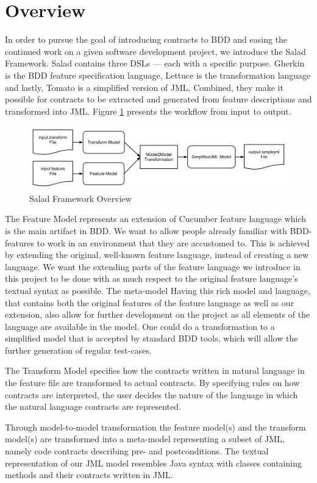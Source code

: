 \section{Overview}

In order to pursue the goal of introducing contracts to BDD and easing the continued work on a given software development project, we introduce the Salad Framework. Salad contains three DSLs --- each with a specific purpose. Gherkin is the BDD feature specification language, Lettuce is the transformation language and lastly, Tomato is a simplified version of JML.  Combined, they make it possible for contracts to be extracted and generated from feature descriptions and transformed into JML. Figure \ref{fig:saladoverview} presents the workflow from input to output.

\begin{figure}
	\begin{center}
		\includegraphics[scale=0.46]{images/framework_overview.png}
	\end{center}
	\caption{Salad Framework Overview}
	\label{fig:saladoverview}
\end{figure}

The Feature Model represents an extension of Cucumber feature language which is the main artifact in BDD. We want to allow people already familiar with BDD-features to work in an environment that they are accustomed to. This is achieved by extending the original, well-known feature language, instead of creating a new language. We want the extending parts of the feature language we introduce in this project to be done with as much respect to the original feature language's textual syntax as possible. The meta-model Having this rich model and language, that contains both the original features of the feature language as well as our extension, also allow for further development on the project as all elements of the language are available in the model. One could do a transformation to a simplified model that is accepted by standard BDD tools, which will allow the further generation of regular test-cases.

The Transform Model specifies how the contracts written in natural language in the feature file are transformed to actual contracts. By specifying rules on how contracts are interpreted, the user decides the nature of the language in which the natural language contracts are represented. 

Through model-to-model transformation the feature model(s) and the transform model(s) are transformed into a meta-model representing a subset of JML, namely code contracts describing pre- and postconditions. The textual representation of our JML model resembles Java syntax with classes containing methods and their contracts written in JML.

